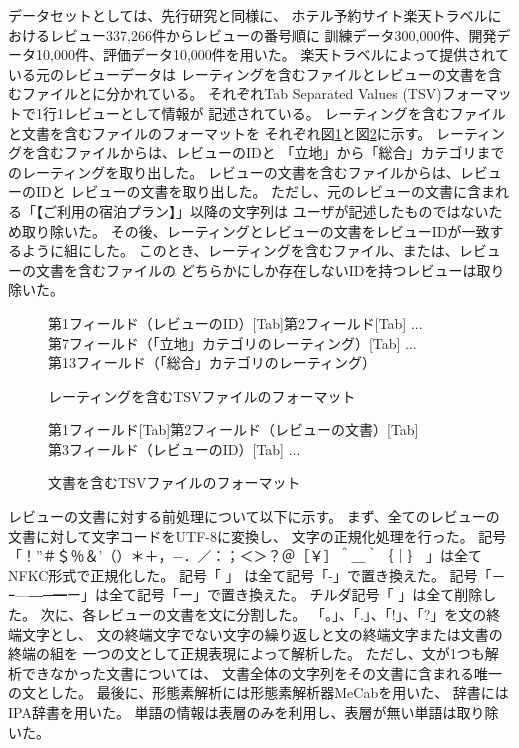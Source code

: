 データセットとしては、先行研究\cite{fujitani15}と同様に、
ホテル予約サイト楽天トラベルにおけるレビュー337,266件からレビューの番号順に
訓練データ300,000件、開発データ10,000件、評価データ10,000件を用いた。
楽天トラベルによって提供されている元のレビューデータは
レーティングを含むファイルとレビューの文書を含むファイルとに分かれている。
それぞれTab Separated Values (TSV)フォーマットで1行1レビューとして情報が
記述されている。
レーティングを含むファイルと文書を含むファイルのフォーマットを
それぞれ図\ref{fig:RatingFileFormat}と図\ref{fig:DocumentFileFormat}に示す。
レーティングを含むファイルからは、レビューのIDと
「立地」から「総合」カテゴリまでのレーティングを取り出した。
レビューの文書を含むファイルからは、レビューのIDと
レビューの文書を取り出した。
ただし、元のレビューの文書に含まれる「【ご利用の宿泊プラン】」以降の文字列は
ユーザが記述したものではないため取り除いた。
その後、レーティングとレビューの文書をレビューIDが一致するように組にした。
このとき、レーティングを含むファイル、または、レビューの文書を含むファイルの
どちらかにしか存在しないIDを持つレビューは取り除いた。
\begin{figure}
  第1フィールド（レビューのID）{[Tab]}第2フィールド{[Tab]} ... \\
  第7フィールド（「立地」カテゴリのレーティング）{[Tab]} ... \\
  第13フィールド（「総合」カテゴリのレーティング）
  \caption{レーティングを含むTSVファイルのフォーマット}
  \label{fig:RatingFileFormat}
\end{figure}
\begin{figure}
  第1フィールド{[Tab]}第2フィールド（レビューの文書）{[Tab]} \\
  第3フィールド（レビューのID）{[Tab]} ...
  \caption{文書を含むTSVファイルのフォーマット}
  \label{fig:DocumentFileFormat}
\end{figure}

レビューの文書に対する前処理について以下に示す。
まず、全てのレビューの文書に対して文字コードをUTF-8に変換し、
文字の正規化処理を行った。
記号「！”＃＄％＆’（）＊＋，−．／：；＜＞？＠［￥］＾＿｀｛｜｝
」は全てNFKC形式で正規化した。
記号「
」
は全て記号「-」で置き換えた。
記号「－ｰ—―─━ー」は全て記号「ー」で置き換えた。
チルダ記号「
」は全て削除した。
次に、各レビューの文書を文に分割した。
「。」、「.」、「!」、「?」を文の終端文字とし、
文の終端文字でない文字の繰り返しと文の終端文字または文書の終端の組を
一つの文として正規表現によって解析した。
ただし、文が1つも解析できなかった文書については、
文書全体の文字列をその文書に含まれる唯一の文とした。
最後に、形態素解析には形態素解析器MeCabを用いた、
辞書にはIPA辞書を用いた。
単語の情報は表層のみを利用し、表層が無い単語は取り除いた。

